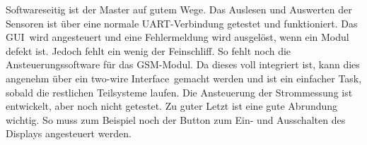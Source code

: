 Softwareseitig   ist  der   Master   auf  gutem   Wege.    Das  Auslesen   und
Auswerten  der  Sensoren  ist  \"uber eine  normale  UART-Verbindung  getestet
und  funktioniert. Das  GUI wird  angesteuert  und  eine  Fehlermeldung  wird
ausgel\"ost,  wenn  ein  Modul  defekt   ist.   Jedoch  fehlt  ein  wenig  der
Feinschliff. So fehlt  noch die  Ansteuerungssoftware f\"ur  das GSM-Modul. Da
dieses  voll   integriert  ist,  kann   dies  angenehm  \"uber   ein  two-wire
Interface gemacht werden  und ist ein  einfacher Task, sobald  die restlichen
Teilsysteme  laufen.  Die  Ansteuerung der  Strommessung ist  entwickelt, aber
noch nicht getestet.  Zu guter Letzt  ist eine gute Abrundung wichtig. So muss
zum Beispiel noch der Button zum Ein- und Ausschalten des Displays angesteuert
werden.
